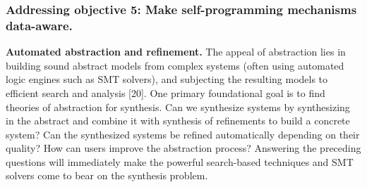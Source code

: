 








\subsubsection{Addressing objective 5: Make self-programming mechanisms data-aware.}

\textbf{Automated abstraction and refinement.} The appeal of abstraction lies in building sound abstract models from complex systems (often using automated logic engines such as SMT solvers), and subjecting the resulting models to efficient search and analysis [20]. One primary foundational goal is to find theories of abstraction for synthesis. Can we synthesize systems by synthesizing in the abstract and combine it with synthesis of refinements to build a concrete system? Can the synthesized systems be refined automatically depending on their quality? How can users improve the abstraction process? Answering the preceding questions will immediately make the powerful search-based techniques and SMT solvers come to bear on the synthesis problem.


